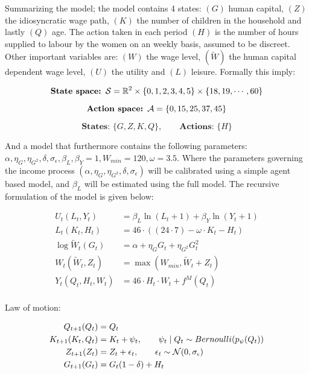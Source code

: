 Summarizing the model; the model contains 4 states: $(G)$ human capital, $(Z)$ the idiosyncratic wage path, $(K)$ the number of children in the household and lastly $(Q)$ age. The action taken in each period $(H)$ is the number of hours supplied to labour by the women on an weekly basis, assumed to be discreet. Other important variables are: $(W)$ the wage level, $(\tilde{W})$ the human capital dependent wage level,  $(U)$ the utility and $(L)$ leisure. Formally this imply:

\begin{equation}
    \textbf{State space: }\mathcal{S} = \mathbb{R}^{2} \times \{0, 1, 2, 3, 4, 5\} \times \{ 18, 19, \cdots, 60\}
\end{equation}

\begin{equation}
    \textbf{Action space: }\mathcal{A}  = \{0, 15, 25, 37, 45\} 
\end{equation}

\begin{equation}
    \textbf{States: }\{G, Z, K, Q\}, \qquad \textbf{Actions: } \{H\} 
\end{equation}

And a model that furthermore contains the following parameters: $\alpha, \eta_G, \eta_{G^2}, \delta, \sigma_\epsilon, \beta_L, \beta_Y=1, W_{min}=120, \omega=3.5$. Where the parameters governing the income process $(\alpha, \eta_G, \eta_{G^2}, \delta, \sigma_\epsilon)$ will be calibrated using a simple agent based model, and $\beta_L$ will be estimated using the full model. The recursive formulation of the model is given below:

\begin{align}
    U_t(L_t, Y_t) &= \beta_L \ln(L_t + 1) + \beta_Y \ln(Y_t + 1) \label{eq:utility_v1}\\
    L_t(K_t, H_t) &= 46 \cdot ((24 \cdot 7) - \omega \cdot K_t  - H_t) \label{eq:leissure_v1}\\
    \log \tilde{W}_t (G_t) &= \alpha + \eta_G G_t + \eta_{G^2} G_t^2 \label{eq:salary_tilde_v1}\\
    W_t(\tilde{W}_t, Z_t) &= \max(W_{min} , \tilde{W}_t  + Z_t)  \label{eq:salary_v1}\\
    Y_t(Q_t,H_t, W_t) &= 46 \cdot H_t \cdot W_t + f^M(Q_t) \label{eq:total_salary_v1}\\
\end{align}

Law of motion:

\begin{align}
    Q_{t+1}(Q_t) &= Q_t \label{eq:age_v1}\\
    K_{t+1}(K_t, Q_t)  &= K_{t} + \psi_t, \qquad \psi_t \mid Q_t \sim Bernoulli(p_\psi(Q_t)) \label{eq:fertility_v1} \\
    Z_{t+1}(Z_t) &= Z_t + \epsilon_t, \qquad \epsilon_t \sim \mathcal{N}(0, \sigma_\epsilon) \label{eq:idiosyncratic_wage_path_v1}\\
    G_{t+1}(G_t) &= G_t(1 - \delta) + H_t \\
\end{align}


